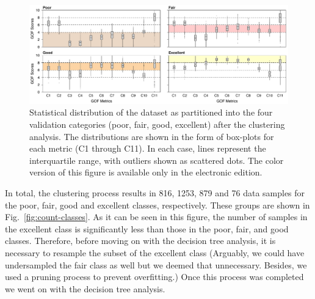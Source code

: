 \begin{figure}
	\centering
	\includegraphics[width=\textwidth]{figures/pdf/figure-06}
	\caption{Statistical distribution of the dataset as partitioned into the four validation categories (poor, fair, good, excellent) after the clustering analysis. The distributions are shown in the form of box-plots for each metric (C1 through C11). In each case,  lines represent the interquartile range, with outliers shown as scattered dots.  The color version of this figure is available only in the electronic edition.}
	\label{fig:boxed-clusters}
\end{figure}

In total, the clustering process results in 816, 1253, 879 and 76 data samples for the poor, fair, good and excellent classes, respectively. These groups are shown in Fig.~\ref{fig:count-classes}. As it can be seen in this figure, the number of samples in the excellent class is significantly less than those in the poor, fair, and good classes. Therefore, before moving on with the decision tree analysis, it is necessary to resample the subset of the excellent class (Arguably, we could have undersampled the fair class as well but we deemed that unnecessary. Besides, we used a  pruning process to prevent overfitting.) Once this process was completed we went on with the decision tree analysis.

